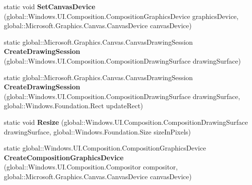 \begin{DoxyCompactItemize}
static void {\bfseries Set\+Canvas\+Device} (global\+::\+Windows.\+U\+I.\+Composition.\+Composition\+Graphics\+Device graphics\+Device, global\+::\+Microsoft.\+Graphics.\+Canvas.\+Canvas\+Device canvas\+Device)
\item 
\mbox{\label{class_microsoft_1_1_graphics_1_1_canvas_1_1_u_i_1_1_composition_1_1_canvas_composition_a1f8acd780668173cb52fdc3fcbcdc428}} 
static global\+::\+Microsoft.\+Graphics.\+Canvas.\+Canvas\+Drawing\+Session {\bfseries Create\+Drawing\+Session} (global\+::\+Windows.\+U\+I.\+Composition.\+Composition\+Drawing\+Surface drawing\+Surface)
\item 
\mbox{\label{class_microsoft_1_1_graphics_1_1_canvas_1_1_u_i_1_1_composition_1_1_canvas_composition_a55e464bf5949c3a7f758e8313be5e37a}} 
static global\+::\+Microsoft.\+Graphics.\+Canvas.\+Canvas\+Drawing\+Session {\bfseries Create\+Drawing\+Session} (global\+::\+Windows.\+U\+I.\+Composition.\+Composition\+Drawing\+Surface drawing\+Surface, global\+::\+Windows.\+Foundation.\+Rect update\+Rect)
\item 
\mbox{\label{class_microsoft_1_1_graphics_1_1_canvas_1_1_u_i_1_1_composition_1_1_canvas_composition_a73077ba32784e9ec043ebe0500e598ea}} 
static void {\bfseries Resize} (global\+::\+Windows.\+U\+I.\+Composition.\+Composition\+Drawing\+Surface drawing\+Surface, global\+::\+Windows.\+Foundation.\+Size size\+In\+Pixels)
\item 
\mbox{\label{class_microsoft_1_1_graphics_1_1_canvas_1_1_u_i_1_1_composition_1_1_canvas_composition_a3b9f17ccd00ef34c54c31646a4186a94}} 
static global\+::\+Windows.\+U\+I.\+Composition.\+Composition\+Graphics\+Device {\bfseries Create\+Composition\+Graphics\+Device} (global\+::\+Windows.\+U\+I.\+Composition.\+Compositor compositor, global\+::\+Microsoft.\+Graphics.\+Canvas.\+Canvas\+Device canvas\+Device)
\item 
\mbox{\label{class_microsoft_1_1_graphics_1_1_canvas_1_1_u_i_1_1_composition_1_1_canvas_composition_a5b9957a9a95828b0fb6d0e5cacbaa376}} 

\end{DoxyCompactItemize}

